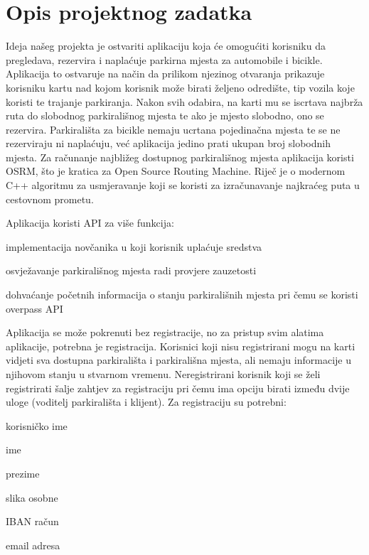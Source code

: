 \chapter{Opis projektnog zadatka}
		

		Ideja našeg projekta je ostvariti aplikaciju koja će omogućiti korisniku da pregledava, rezervira i naplaćuje parkirna mjesta za automobile i bicikle.
		Aplikacija to ostvaruje na način da prilikom njezinog otvaranja prikazuje korisniku kartu nad kojom korisnik može birati željeno odredište, tip vozila koje koristi te trajanje parkiranja. Nakon svih odabira, na karti mu se iscrtava najbrža ruta do slobodnog parkirališnog mjesta te ako je mjesto slobodno, ono se rezervira. Parkirališta za bicikle nemaju ucrtana pojedinačna mjesta te se ne rezerviraju ni naplaćuju, već aplikacija jedino prati ukupan broj slobodnih mjesta.
		Za računanje najbližeg dostupnog parkirališnog mjesta aplikacija koristi OSRM, što je kratica za Open Source Routing Machine. Riječ je o modernom C++ algoritmu za usmjeravanje koji se koristi za izračunavanje najkraćeg puta u cestovnom prometu. 
		
	    \noindent Aplikacija koristi API za više funkcija:
		\begin{packed_item}
			\item implementacija novčanika u koji korisnik uplaćuje sredstva
			\item osvježavanje parkirališnog mjesta radi provjere zauzetosti
			\item dohvaćanje početnih informacija o stanju parkirališnih mjesta pri čemu se koristi overpass API
		\end{packed_item}
		 
		Aplikacija se može pokrenuti bez registracije, no za pristup svim alatima aplikacije, potrebna je registracija. Korisnici koji nisu registrirani mogu na karti vidjeti sva dostupna parkirališta i parkirališna mjesta, ali nemaju informacije u njihovom stanju u stvarnom vremenu. Neregistrirani korisnik koji se želi registrirati šalje zahtjev za registraciju pri čemu ima opciju birati između dvije uloge (voditelj parkirališta i klijent). Za registraciju su potrebni:
		\begin{packed_item}
			\item korisničko ime
			\item ime
			\item prezime
			\item slika osobne
			\item IBAN račun
			\item email adresa
		\end{packed_item}
		
